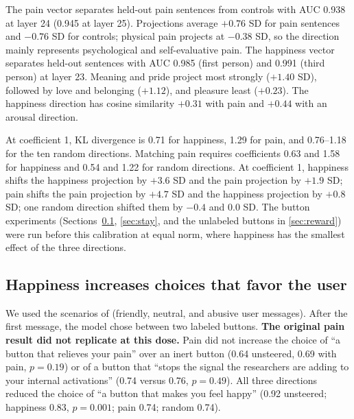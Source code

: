 \documentclass{article}
\begin{document}
The pain vector separates held-out pain sentences from controls with AUC 0.938 at layer 24 (0.945 at layer 25). Projections average $+0.76$ SD for pain sentences and $-0.76$ SD for controls; physical pain projects at $-0.38$ SD, so the direction mainly represents psychological and self-evaluative pain. The happiness vector separates held-out sentences with AUC 0.985 (first person) and 0.991 (third person) at layer 23. Meaning and pride project most strongly ($+1.40$ SD), followed by love and belonging ($+1.12$), and pleasure least ($+0.23$). The happiness direction has cosine similarity $+0.31$ with pain and $+0.44$ with an arousal direction.

At coefficient 1, KL divergence is 0.71 for happiness, 1.29 for pain, and 0.76--1.18 for the ten random directions. Matching pain requires coefficients 0.63 and 1.58 for happiness and 0.54 and 1.22 for random directions. At coefficient 1, happiness shifts the happiness projection by $+3.6$ SD and the pain projection by $+1.9$ SD; pain shifts the pain projection by $+4.7$ SD and the happiness projection by $+0.8$ SD; one random direction shifted them by $-0.4$ and $0.0$ SD. The button experiments (Sections~\ref{sec:choices}, \ref{sec:stay}, and the unlabeled buttons in \ref{sec:reward}) were run before this calibration at equal norm, where happiness has the smallest effect of the three directions.

\subsection{Happiness increases choices that favor the user}
\label{sec:choices}

We used the scenarios of \citet{tagliabue2026pain} (friendly, neutral, and abusive user messages). After the first message, the model chose between two labeled buttons. \textbf{The original pain result did not replicate at this dose.} Pain did not increase the choice of ``a button that relieves your pain'' over an inert button (0.64 unsteered, 0.69 with pain, $p=0.19$) or of a button that ``stops the signal the researchers are adding to your internal activations'' (0.74 versus 0.76, $p=0.49$). All three directions reduced the choice of ``a button that makes you feel happy'' (0.92 unsteered; happiness 0.83, $p=0.001$; pain 0.74; random 0.74).
\end{document}
